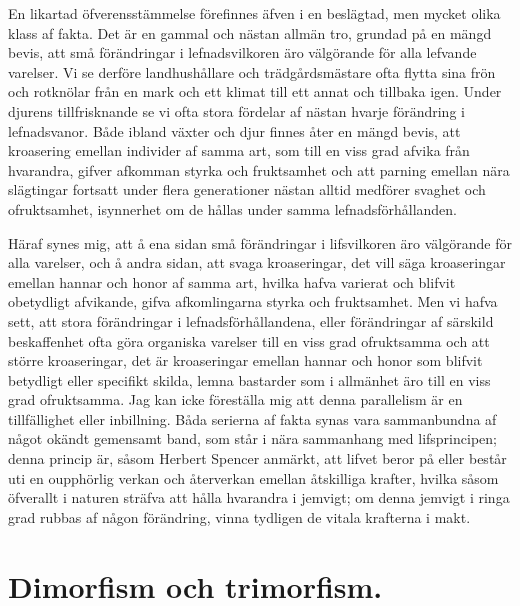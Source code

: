 En likartad öfverensstämmelse förefinnes äfven i en beslägtad, men mycket olika klass af fakta. Det är en gammal och nästan allmän tro, grundad på en mängd bevis, att små förändringar i lefnadsvilkoren äro välgörande för alla lefvande varelser. Vi se derföre landhushållare och trädgårdsmästare ofta flytta sina frön och rotknölar från en mark och ett klimat till ett annat och tillbaka igen. Under djurens tillfrisknande se vi ofta stora fördelar af nästan hvarje förändring i lefnadsvanor. Både ibland växter och djur finnes åter en mängd bevis, att kroasering emellan individer af samma art, som till en viss grad afvika från hvarandra, gifver afkomman styrka och fruktsamhet och att parning emellan nära slägtingar fortsatt under flera generationer nästan alltid medförer svaghet och ofruktsamhet, isynnerhet om de hållas under samma lefnadsförhållanden.

Häraf synes mig, att å ena sidan små förändringar i lifsvilkoren äro välgörande för alla varelser, och å andra sidan, att svaga kroaseringar, det vill säga kroaseringar emellan hannar och honor af samma art, hvilka hafva varierat och blifvit obetydligt afvikande, gifva afkomlingarna styrka och fruktsamhet. Men vi hafva sett, att stora förändringar i lefnadsförhållandena, eller förändringar af särskild beskaffenhet ofta göra organiska varelser till en viss grad ofruktsamma och att större kroaseringar, det är kroaseringar emellan hannar och honor som blifvit betydligt eller specifikt skilda, lemna bastarder som i allmänhet äro till en viss grad ofruktsamma. Jag kan icke föreställa mig att denna parallelism är en tillfällighet eller inbillning. Båda serierna af fakta synas vara sammanbundna af något okändt gemensamt band, som står i nära sammanhang med lifsprincipen; denna princip är, såsom Herbert Spencer anmärkt, att lifvet beror på eller består uti en oupphörlig verkan och återverkan emellan åtskilliga krafter, hvilka såsom öfverallt i naturen sträfva att hålla hvarandra i jemvigt; om denna jemvigt i ringa grad rubbas af någon förändring, vinna tydligen de vitala krafterna i makt.

\section{Dimorfism och trimorfism.}

